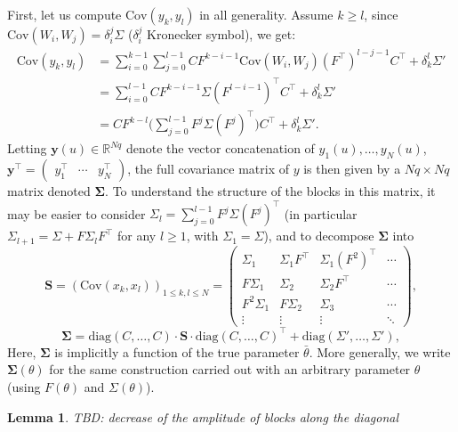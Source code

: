 \documentclass[twocolumn]{autart}
\newcommand{\ludo}{\color{ForestGreen}}
\newtheorem{lemma}[theorem]{Lemma}
\theoremstyle{definition}
\theoremstyle{remark}
\newcommand{\R}{\mathbb{R}}
\newcommand{\Cov}{\mathrm{Cov}}
\newcommand{\yb}{\mathbf{y}}
\newcommand{\Sb}{\mathbf{S}}
\newcommand{\diag}{\mathrm{diag}}
\newcommand{\Sigmab}{\boldsymbol{\Sigma}}
\begin{document}
First, let us compute $\Cov(y_k,y_l)$ in all generality. Assume $k\geq l$, since $\Cov(W_i,W_j)=\delta_i^j \Sigma$ ($\delta_i^j$ Kronecker symbol), we get:
$$
\begin{aligned}
\Cov(y_k,y_l)
&=
\sum_{i=0}^{k-1}\sum_{j=0}^{l-1}CF^{k-i-1}\Cov(W_i,W_j)(F^\top)^{l-j-1}C^\top
+\delta_k^l\Sigma'\\
&=
\sum_{i=0}^{l-1}CF^{k-i-1}\Sigma(F^{l-i-1})^\top C^\top
+\delta_k^l\Sigma'
\\
&=
CF^{k-l}\bigg(\sum_{j=0}^{l-1}F^{j}\Sigma(F^j)^{\top}\bigg)C^\top
+\delta_k^l\Sigma'. %
\end{aligned}
$$
Letting $\yb(u)\in \R^{Nq}$ denote the vector concatenation of $y_1(u),\dots ,y_N(u)$, $\yb^\top=\begin{pmatrix}
y_1^\top & \cdots & y_N^\top
\end{pmatrix}$,
the full covariance matrix of $y$ is then given by a $Nq\times Nq$ matrix denoted $\Sigmab$. To understand the structure of the blocks in this matrix, it may be easier to consider $\Sigma_l=\sum_{j=0}^{l-1}F^{j}\Sigma(F^j)^{\top}$ (in particular $\Sigma_{l+1}=\Sigma+F \Sigma_l F^\top$ for any $l\geq 1$, with $\Sigma_1=\Sigma$), and to decompose $\Sigmab$ into
$$
\Sb
=
\left(\Cov(x_k,  x_l)\right)_{1\leq k,l\leq N}
=
\begin{pmatrix}
\Sigma_1 & \Sigma_1 F^\top & \Sigma_1 (F^2)^\top & \cdots 
\\
F \Sigma_1 & \Sigma_2  & \Sigma_2 F^\top & \cdots 
\\
F^2 \Sigma_1 & F\Sigma_2  & \Sigma_3  & \cdots 
\\
\vdots&\vdots&\vdots&\ddots
\end{pmatrix},
$$
$$
\Sigmab
=
\diag(C,\dots, C)
\cdot\Sb\cdot
\diag(C,\dots, C)^\top
+
\diag(\Sigma', \dots, \Sigma'),
$$
Here, $\Sigmab$ is implicitly a function of the true parameter $\bar\theta$. %
More generally, we write $\Sigmab(\theta)$ for the same construction carried out with an arbitrary parameter $\theta$ (using $F(\theta)$ and $\Sigma(\theta)$).

\begin{lemma}
\ludo TBD: decrease of the amplitude of blocks along the diagonal
\end{lemma}
\end{document}
